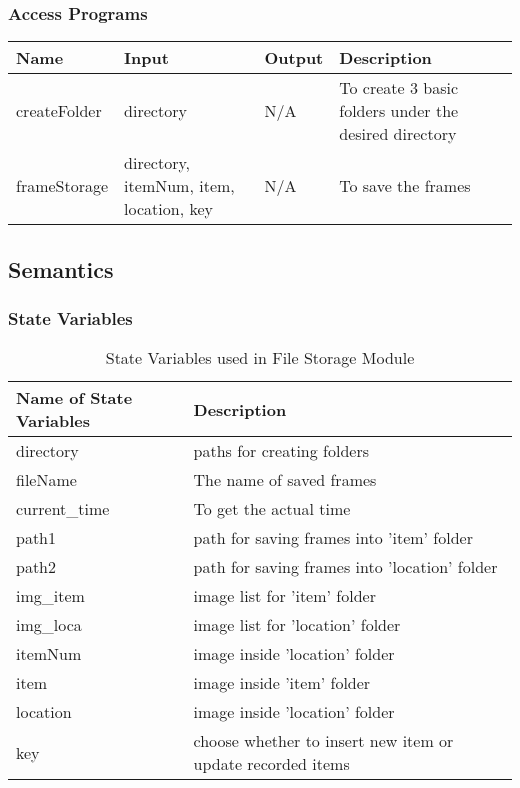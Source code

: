 \documentclass[12pt, titlepage]{article}
\begin{document}
\subsubsection{Access Programs}
\begin{center}
\begin{tabular}{|p{3cm}|p{2cm}|l|p{6cm}|}
\hline
\textbf{Name} & \textbf{Input} & \textbf{Output} & \textbf{Description}\\
\hline
createFolder & directory & N/A & To create 3 basic folders under the desired directory\\
\hline
frameStorage & directory, itemNum, item, location, key & N/A & To save the frames\\
\hline

\end{tabular}
\end{center}
\subsection{Semantics}

\subsubsection{State Variables}
\begin{table}[H]
\caption{State Variables used in File Storage Module} 
\begin{tabularx}{\textwidth}{XX}
\toprule
\textbf{Name of State Variables} & \textbf{Description}\\
\midrule
directory & paths for creating folders\\
fileName & The name of saved frames\\
current_time & To get the actual time\\
path1 & path for saving frames into 'item' folder\\
path2 & path for saving frames into 'location' folder\\
img\_item & image list for 'item' folder\\
img\_loca & image list for 'location' folder\\
itemNum & image inside 'location' folder\\
item & image inside 'item' folder\\
location & image inside 'location' folder\\
key & choose whether to insert new item or update recorded items\\
\bottomrule
\end{tabularx}
\end{table}
\end{document}
